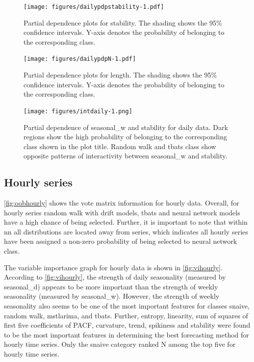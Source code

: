 \documentclass[11pt,a4paper,]{article}
\begin{document}
\begin{figure}
\centering
\texttt{[image: figures/dailypdpstability-1.pdf]}
\caption{\label{fig:dailypdpstability}Partial dependence plots for stability. The shading shows the 95\% confidence intervals. Y-axis denotes the probability of belonging to the corresponding class.}
\end{figure}

\begin{figure}
\centering
\texttt{[image: figures/dailypdpN-1.pdf]}
\caption{\label{fig:dailypdpN}Partial dependence plots for length. The shading shows the 95\% confidence intervals. Y-axis denotes the probability of belonging to the corresponding class.}
\end{figure}

\begin{figure}
\centering
\texttt{[image: figures/intdaily-1.png]}
\caption{\label{fig:intdaily}Partial dependence of seasonal\_w and stability for daily data. Dark regions show the high probability of belonging to the corresponding class shown in the plot title. Random walk and tbats class show opposite patterns of interactivity between seasonal\_w and stability.}
\end{figure}

\hypertarget{hourly-series}{%
\subsection{Hourly series}\label{hourly-series}}

\autoref{fig:oobhourly} shows the vote matrix information for hourly data. Overall, for hourly series random walk with drift models, tbats and neural network models have a high chance of being selected. Further, it is important to note that within nn all distributions are located away from series, which indicates all hourly series have been assigned a non-zero probability of being selected to neural network class.

The variable importance graph for hourly data is shown in \autoref{fig:vihourly}. According to \autoref{fig:vihourly}, the strength of daily seasonality (measured by seasonal\_d) appears to be more important than the strength of weekly seasonality (measured by seasonal\_w). However, the strength of weekly seasonality also seems to be one of the most important features for classes snaive, random walk, mstlarima, and tbats. Further, entropy, linearity, sum of squares of first five coefficients of PACF, curvature, trend, spikiness and stability were found to be the most important features in determining the best forecasting method for hourly time series. Only the snaive category ranked N among the top five for hourly time series.
\end{document}
